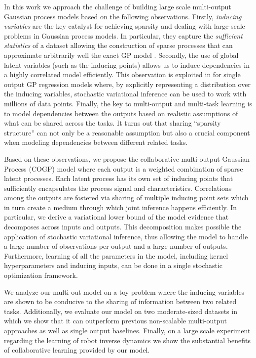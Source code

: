 In this work we approach the challenge of building large scale multi-output Gaussian process models  
based on the following observations.
Firstly, \emph{inducing variables} are the key catalyst
for achieving sparsity and dealing with large-scale problems in Gaussian process models.
In particular, they capture the \emph{sufficient statistics} of a dataset allowing the construction of sparse 
processes that can approximate arbitrarily well the exact GP model \citep{titsias2009variational}.
Secondly, the use of global latent variables (such as the inducing points) allows us to 
induce dependencies in a highly correlated model efficiently. 
This observation is exploited in \cite{hensmangaussian} for single output GP regression models 
where, by explicitly representing a distribution over the inducing variables, stochastic variational inference 
can be used to work with millions of data points.
Finally, the key to multi-output and multi-task learning is to model dependencies between the outputs  
based on realistic assumptions of what can be shared across the tasks. It turns out that 
sharing  ``sparsity structure'' can not only be a reasonable assumption but also a crucial component
when modeling dependencies between different related tasks.


Based on these observations, we propose the collaborative multi-output Gaussian Process (COGP) model 
where each output is a weighted combination of sparse latent processes.
 Each latent process has its own set of inducing points that sufficiently encapsulates the process signal and characteristics.
Correlations among the outputs are fostered via sharing of multiple inducing point sets 
which in turn create a medium through which joint inference happens efficiently.
In particular, we derive a variational lower bound of the model evidence that decomposes across 
inputs and outputs. 
This decomposition makes possible the application of stochastic variational inference, 
thus allowing the model to handle a large number of observations per output and a large number of outputs.
Furthermore, learning of all  the  parameters in the model, including
kernel hyperparameters and inducing inputs, can be done in a single stochastic optimization framework.

We analyze our multi-out model on a toy problem  where the inducing variables are shown to be 
conducive to the sharing of information between two related tasks. 
Additionally, we  evaluate  our model on two moderate-sized datasets in which we show that it
can outperform previous non-scalable multi-output approaches as well as single output baselines.
Finally, on a  large scale experiment regarding the learning of robot inverse dynamics we show 
the substantial benefits of collaborative learning provided by our model.
  
